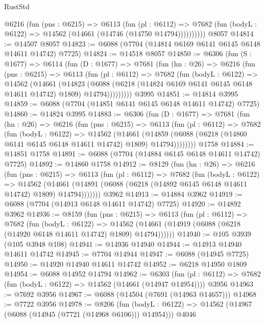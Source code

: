 \begin{lexlean}{RustStd}
\begin{coremodule}
          @6216
            (fun (pns : @6215) =>
            @6113
              (fun (pl : @6112) =>
              @7682 (fun (bodyL : @6122) => @14562 (@14661 (@14746 (@14750 @14794))))))))))
    @8057
@14814 := @14507 @8057
@14823 := @6088 (@7704 (@14814 @6169 @6141 @6145 @6148 @14611 @14742) @7725)
@14824 := @14518 @8057
@14850 := @6306
    (fun (S : @1677) =>
    @6114
      (fun (D : @1677) =>
      @7681
        (fun (hn : @26) =>
        @6216
          (fun (pns : @6215) =>
          @6113
            (fun (pl : @6112) =>
            @7682
              (fun (bodyL : @6122) =>
              @14562
                (@14661
                  (@14823
                    (@6088
                      (@6218 (@14824 @6169 @6141 @6145 @6148 @14611 @14742) @1809)
                      @14794)))))))))
    @3995
@14851 := @14814 @3995
@14859 := @6088 (@7704 (@14851 @6141 @6145 @6148 @14611 @14742) @7725)
@14860 := @14824 @3995
@14883 := @6306
    (fun (D : @1677) =>
    @7681
      (fun (hn : @26) =>
      @6216
        (fun (pns : @6215) =>
        @6113
          (fun (pl : @6112) =>
          @7682
            (fun (bodyL : @6122) =>
            @14562
              (@14661
                (@14859 (@6088 (@6218 (@14860 @6141 @6145 @6148 @14611 @14742) @1809) @14794))))))))
    @1758
@14884 := @14851 @1758
@14891 := @6088 (@7704 (@14884 @6145 @6148 @14611 @14742) @7725)
@14892 := @14860 @1758
@14912 := @8129
    (fun (hn : @26) =>
    @6216
      (fun (pns : @6215) =>
      @6113
        (fun (pl : @6112) =>
        @7682
          (fun (bodyL : @6122) =>
          @14562
            (@14661 (@14891 (@6088 (@6218 (@14892 @6145 @6148 @14611 @14742) @1809) @14794)))))))
    @3962
@14913 := @14884 @3962
@14919 := @6088 (@7704 (@14913 @6148 @14611 @14742) @7725)
@14920 := @14892 @3962
@14936 := @8159
    (fun (pns : @6215) =>
    @6113
      (fun (pl : @6112) =>
      @7682
        (fun (bodyL : @6122) =>
        @14562 (@14661 (@14919 (@6088 (@6218 (@14920 @6148 @14611 @14742) @1809) @14794))))))
@14940 := @105 @3939 (@105 @3948 @108)
@14941 := @14936 @14940
@14944 := @14913 @14940 @14611 @14742
@14945 := @7704 @14944
@14947 := @6088 (@14945 @7725)
@14950 := @14920 @14940 @14611 @14742
@14952 := @6218 @14950 @1809
@14954 := @6088 @14952 @14794
@14962 := @6303
    (fun (pl : @6112) => @7682 (fun (bodyL : @6122) => @14562 (@14661 (@14947 @14954))))
    @3956
@14963 := @7692 @3956
@14967 := @6088 (@14504 (@7691 (@14963 @14657)))
@14968 := @7722 @3956
@14978 := @8206
    (fun (bodyL : @6122) => @14562 (@14967 (@6088 (@14945 (@7721 (@14968 @6106))) @14954)))
    @4046

\end{coremodule}
\end{lexlean}
